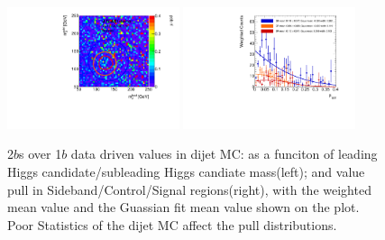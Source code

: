 \begin{figure}[htbp!]
\begin{center}
\includegraphics[angle=270, width=0.45\textwidth]{./figures/boosted/AppendixMuqcdstudy/QCD_TwoTag_split_Incl_mH0H1.pdf}
\includegraphics[angle=270, width=0.45\textwidth]{./figures/boosted/AppendixMuqcdstudy/QCD_TwoTag_split_Incl_mH0H1_pull.pdf}
\caption{2$b$s over 1$b$ data driven \muqcd values in dijet MC: \muqcd as a funciton of leading Higgs candidate/subleading Higgs candiate mass(left); and \muqcd value pull in Sideband/Control/Signal regions(right), with the weighted mean value and the Guassian fit mean value shown on the plot. Poor Statistics of the dijet MC affect the pull distributions.}
\label{fig:app-muqcd-2bs-qcd}
\end{center}
\end{figure}

